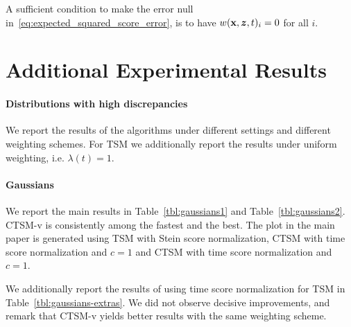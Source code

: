 A sufficient condition to make the error null in~\eqref{eq:expected_squared_score_error}, is to have $w(\operatorname{\mathbf{x}}, {\bm{z}}, t)_{i} = 0$ for all $i$.




\newpage
\section{Additional Experimental Results}
\label{app:sec:additional_experimental_results}

\paragraph{Distributions with high discrepancies}

We report the results of the algorithms under different settings and different weighting schemes. For TSM we additionally report the results under uniform weighting, i.e. $\lambda(t)=1$. 



\paragraph{Gaussians}

We report the main results in Table~\ref{tbl:gaussians1} and Table~\ref{tbl:gaussians2}. CTSM-v is consistently among the fastest and the best. The plot in the main paper is generated using TSM with Stein score normalization, CTSM with time score normalization and $c=1$ and CTSM with time score normalization and $c=1$.

We additionally report the results of using time score normalization for TSM in Table~\ref{tbl:gaussians-extras}. We did not observe decisive improvements, and remark that CTSM-v yields better results with the same weighting scheme.

